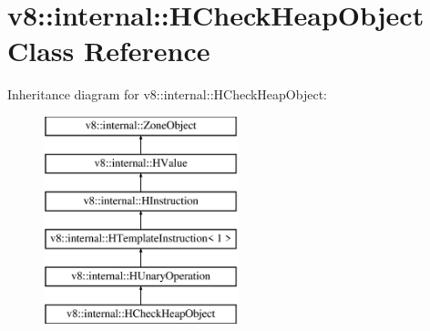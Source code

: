 \hypertarget{classv8_1_1internal_1_1_h_check_heap_object}{}\section{v8\+:\+:internal\+:\+:H\+Check\+Heap\+Object Class Reference}
\label{classv8_1_1internal_1_1_h_check_heap_object}
Inheritance diagram for v8\+:\+:internal\+:\+:H\+Check\+Heap\+Object\+:\begin{figure}[H]
\begin{center}
\leavevmode
\includegraphics[height=6.000000cm]{classv8_1_1internal_1_1_h_check_heap_object}
\end{center}
\end{figure}
